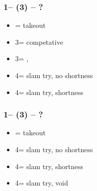 \documentclass[12pt, a4paper]{article}
\begin{document}
\subsubsection*{1\hearts -- (3\diams) -- ?}
\begin{itemize}
    \item \dbl = takeout
    \item 3\hearts = competative
    \item 3\spades = \spades, \gf
    \item 4\clubs = slam try, no \diams shortness
    \item 4\diams = slam try, \diams shortness
\end{itemize}

\subsubsection*{1\hearts -- (3\spades) -- ?}
\begin{itemize}
    \item \dbl = takeout
    \item 4\clubs = slam try, no \spades shortness
    \item 4\diams = slam try, \spades shortness
    \item 4\spades = slam try, \spades void
\end{itemize}

\end{document}
